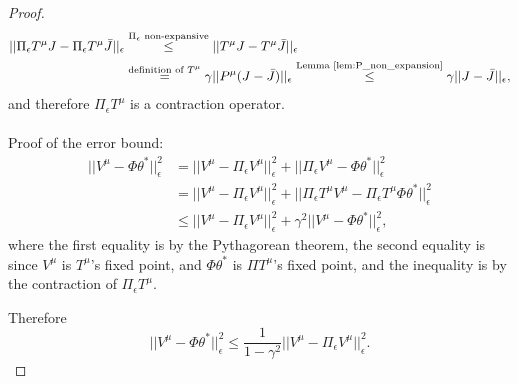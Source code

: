\begin{proof}
\begin{equation*}
\begin{split}
||\Pi_\epsilon T^\mu J - \Pi_\epsilon T^\mu \bar{J}||_\epsilon &\overset{\Pi_\epsilon \textrm{ non-expansive}}{\le} ||T^\mu J - T^\mu \bar{J}||_\epsilon\\
&\overset{\textrm{definition of } T^\mu}{=} \gamma||P^\mu(J-\bar{J})||_\epsilon \overset{\textrm{Lemma \ref{lem:P_non_expansion}}}{\le} \gamma||J-\bar{J}||_\epsilon ,
\end{split}
\end{equation*}
and therefore $\Pi_\epsilon T^\mu$ is a contraction operator.
\\
\\
Proof of the error bound:
\begin{equation}
\begin{split}
  ||V^\mu - \Phi \theta^*||_\epsilon^2  &= ||V^\mu
-\Pi_\epsilon V^\mu||_\epsilon^2 + ||\Pi_\epsilon V^\mu -\Phi \theta^*||_\epsilon^2  \\
    &= ||V^\mu -\Pi_\epsilon V^\mu||_\epsilon^2 + ||\Pi_\epsilon T^\mu V^\mu -\Pi_\epsilon T^\mu\Phi \theta^*||_\epsilon^2 \\
&\leq ||V^\mu -\Pi_\epsilon V^\mu||_\epsilon^2 + \gamma^2||V^\mu-\Phi \theta^*||_\epsilon^2,
\end{split}
\end{equation}
where the first equality is by the Pythagorean theorem, the second equality is since $V^\mu$ is $T^\mu$'s fixed point, and $\Phi \theta^*$ is $\Pi T^\mu$'s fixed point, and the inequality is by the contraction of $\Pi_\epsilon T^\mu$.

Therefore
$$||V^\mu - \Phi \theta^*||_\epsilon^2 \le \frac{1}{1-\gamma^2}||V^\mu-\Pi_\epsilon V^\mu||_\epsilon^2.$$
\end{proof}

